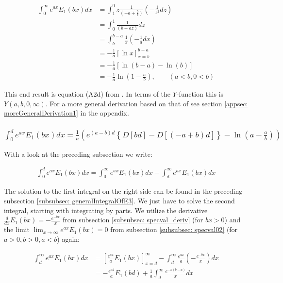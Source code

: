 \documentclass[bibliography=totocnumbered]{scrartcl}
\newcommand{\assume}[1][\text{MISSING PARAMETER}]{,\qquad\left(#1\right)}
\begin{document}
	\begin{align}
		\int_{0}^{\infty}e^{ax}E_1\left(bx\right)dx&=\int_{1}^{0}z\frac{1}{\left(-a+\frac{b}{z}\right)}\left(-\frac{1}{z^2}dz\right)\\
		&=\int_{0}^{1}\frac{1}{\left(b-az\right)}dz\\
		&=\int_{b}^{b-a}\frac{1}{x}\left(-\frac{1}{a}dx\right)\\
		&=-\frac{1}{a}\left[\ln{x}\right]^{b-a}_{x=b}\\
		&=-\frac{1}{a}\left[\ln{\left(b-a\right)}-\ln{\left(b\right)}\right]\\
		&=-\frac{1}{a}\ln{\left(1-\frac{a}{b}\right)}\assume[a<b, 0<b]\label{eq: generalIntegralOfE3}
	\end{align}
	
	This end result is equation (A2d) from \cite{boer1990calc}. In terms of the $Y$-function this is $Y\left(a,b,0,\infty\right)$. For a more general derivation based on that of \autocite[73\psq]{schloemilch} see section \ref{appsec: moreGeneralDerivation1} in the appendix.
	
	\subsubsection[A integral of E1, involving the exponential function]{$\int_{0}^{d}e^{ax}E_1\left(bx\right)dx=\frac{1}{a}\left(e^{\left(a-b\right)d}\left\{D\left[bd\right]-D\left[\left(-a+b\right)d\right]\right\}-\ln{\left(a-\frac{a}{b}\right)}\right)$}
	
	With a look at the preceding subsection we write:
	
	\begin{gather}
		\int_{0}^{d}e^{ax}E_1\left(bx\right)dx=\int_{0}^{\infty}e^{ax}E_1\left(bx\right)dx-\int_{d}^{\infty}e^{ax}E_1\left(bx\right)dx\label{eq: integralSplit1}
	\end{gather}
	
	The solution to the first integral on the right side can be found in the preceding subsection \ref{subsubsec: generalIntegralOfE3}. We just have to solve the second integral, starting with integrating by parts. We utilize the derivative $\frac{d}{dx}E_1\left(bx\right)=-\frac{e^{-bx}}{x}$ from subsection \ref{subsubsec: specval_deriv} (for $bx>0$) and the limit $\lim_{x\rightarrow\infty}e^{ax}E_1\left(bx\right)=0$ from subsection \ref{subsubsec: specval02} (for $a>0, b>0, a<b$) again:
	
	\begin{align}
		\int_{d}^{\infty}e^{ax}E_1\left(bx\right)dx&=\left[\frac{e^{ax}}{a}E_1\left(bx\right)\right]^{\infty}_{x=d}-\int_{d}^{\infty}\frac{e^{ax}}{a}\left(-\frac{e^{-bx}}{x}\right)dx\\
		&=-\frac{e^{ad}}{a}E_1\left(bd\right)+\frac{1}{a}\int_{d}^{\infty}\frac{e^{-x\left(b-a\right)}}{x}dx
	\end{align}
	
\end{document}
